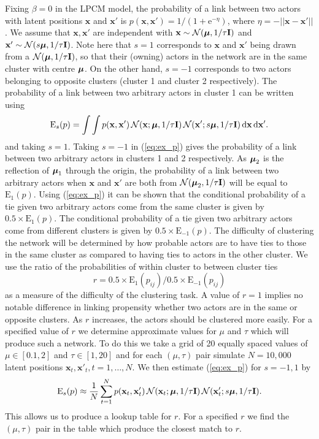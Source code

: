 \documentclass[12pt]{article}
\newcommand{\x}{{\mathbf{x}}}
\newcommand{\diff}{\mathrm{d}}
\newcommand{\bfmu}{\hbox{\boldmath$\mu$}}
\begin{document}
Fixing $\beta=0$ in the LPCM model, the probability of a link between two actors with latent positions $\x$ and $\x'$ is
$p( \x, \x') = 1/(1 + \mathrm{e}^{-\eta})$, where $\eta = - ||\x - \x'||$. We assume that $\x, \x'$ are independent with $\x \sim \mathcal{N}(\bfmu, 1/\tau\mathbf{I})$
and $\x' \sim \mathcal{N}( s \bfmu, 1/\tau\mathbf{I})$. Note here that $s=1$ corresponds to $\x$ and $\x'$ being drawn from a $\mathcal{N}(\bfmu, 1/\tau \mathbf{I})$, so that their (owning) actors in the network are in the same cluster with centre $\bfmu$. 
On the other hand, $s=-1$ corresponds to two actors belonging to opposite clusters (cluster 1 and cluster 2 respectively). The probability of a link between two arbitrary actors in cluster 1 can be written using
\begin{equation}
\mathrm{E}_s(p) = \int \int p( \x, \x')\, \mathcal{N}(\x; \bfmu, 1/\tau  \mathbf{I}) \, \mathcal{N}( \x'; s\bfmu, 1/\tau\mathbf{I})\, \diff \x \,\diff \x'. \label{eq:ex_p}
\end{equation}
and taking $s=1$. Taking $s=-1$ in (\ref{eq:ex_p}) gives the probability of a link between two arbitrary actors in clusters 1 and 2 respectively. 
As $\bfmu_2$ is the reflection of $\bfmu_1$ through the origin, the probability of a link between two arbitrary actors when $\x$ and $\x'$ are both from $\mathcal{N}(\bfmu_2, 1/\tau \mathbf{I})$ will be equal to $\mathrm{E}_1(p)$. 
Using (\ref{eq:ex_p}) it can be shown that the conditional probability of a tie given two arbitrary actors come from the same cluster is given by $0.5\times \mathrm{E}_1(p)$. The conditional probability of a tie given two arbitrary actors come from different clusters is given by $0.5\times \mathrm{E}_{-1}(p)$.
The difficulty of clustering the network will be determined by how probable actors are to have ties to those in the same cluster as compared to having ties to actors in the other cluster. We use the ratio of the probabilities of within cluster to between cluster ties
\[
r = 0.5 \times \mathrm{E}_{1}(p_{ij}) / 0.5 \times \mathrm{E}_{-1}(p_{ij})
\]
as a measure of the difficulty of the clustering task. A value of $r=1$ implies no notable difference in linking propensity whether two actors are in the same or opposite clusters. As $r$ increases, the actors should be clustered more easily. For a specified value of $r$ we determine approximate values for $\mu$ and $\tau$ which will produce such a network. To do this we take a grid of 20 equally spaced values of $\mu \in [0.1,2]$ and $\tau \in [1,20]$ and for each $(\mu,\tau)$ pair simulate $N=10,000$ latent positions $\x_t,\x'_t, t=1,\dots,N$. We then estimate (\ref{eq:ex_p}) for $s=-1,1$ by
\[
\mathrm{E}_s(p) \approx \frac{1}{N} \sum_{t=1}^N p( \x_t, \x'_t)\, \mathcal{N}(\x_t; \bfmu, 1/\tau  \mathbf{I}) \, \mathcal{N}( \x'_t; s\bfmu, 1/\tau\mathbf{I}).
\]
This allows us to produce a lookup table for $r$. For a specified $r$ we find the $(\mu,\tau)$ pair in the table which produce the closest match to $r$.


\end{document}
